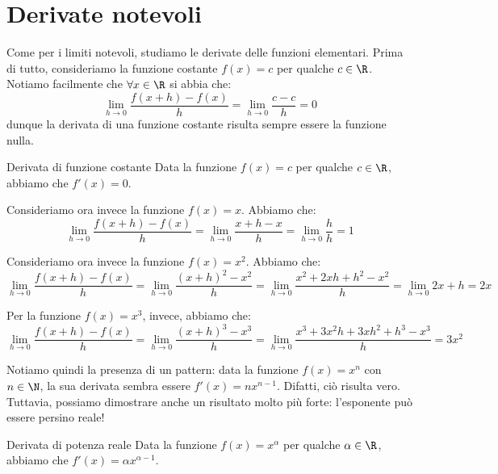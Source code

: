 \documentclass[a4paper, 12pt]{report}
\begin{document}
    \quad

    \section{Derivate notevoli}

    Come per i limiti notevoli, studiamo le derivate delle funzioni elementari. Prima di tutto, consideriamo la funzione costante $f(x) = c$ per qualche $c \in \R$. Notiamo facilmente che $\forall x \in \R$ si abbia che:
    \[\lim_{h \to 0} \frac{f(x+h)-f(x)}{h} = \lim_{h \to 0} \frac{c-c}{h} = 0\]
    dunque la derivata di una funzione costante risulta sempre essere la funzione nulla.

    \begin{framedprop}{Derivata di funzione costante}
        Data la funzione $f(x) = c$ per qualche $c \in \R$, abbiamo che $f'(x) = 0$.
    \end{framedprop}
    
    Consideriamo ora invece la funzione $f(x) = x$. Abbiamo che:
    \[\lim_{h \to 0} \frac{f(x+h)-f(x)}{h} = \lim_{h \to 0} \frac{x+h-x}{h} = \lim_{h \to 0} \frac{h}{h} = 1\]

    Consideriamo ora invece la funzione $f(x) = x^2$. Abbiamo che:
    \[\lim_{h \to 0} \frac{f(x+h)-f(x)}{h} = \lim_{h \to 0} \frac{(x+h)^2-x^2}{h} = \lim_{h \to 0} \frac{x^2+2xh+h^2-x^2}{h} = \lim_{h \to 0} 2x+h = 2x\]

    Per la funzione $f(x) = x^3$, invece, abbiamo che:
    \[\lim_{h \to 0} \frac{f(x+h)-f(x)}{h} = \lim_{h \to 0} \frac{(x+h)^3-x^3}{h} = \lim_{h \to 0} \frac{x^3+3x^2h+3xh^2+h^3-x^3}{h} = 3x^2\]

    Notiamo quindi la presenza di un pattern: data la funzione $f(x) = x^n$ con $n \in \N$, la sua derivata sembra essere $f'(x) = nx^{n-1}$. Difatti, ciò risulta vero. Tuttavia, possiamo dimostrare anche un risultato molto più forte: l'esponente può essere persino reale!

    \begin{framedprop}{Derivata di potenza reale}
        Data la funzione $f(x) = x^{\alpha}$ per qualche $\alpha \in \R$, abbiamo che $f'(x) = \alpha x^{\alpha-1}$.
    \end{framedprop}
\end{document}
